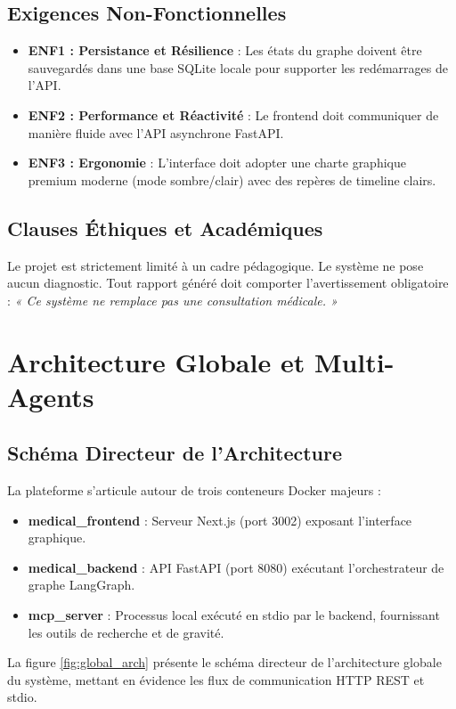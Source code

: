 \documentclass[11pt,a4paper]{report}
\begin{document}
\section{Exigences Non-Fonctionnelles}
\begin{itemize}
    \item \textbf{ENF1 : Persistance et Résilience} : Les états du graphe doivent être sauvegardés dans une base SQLite locale pour supporter les redémarrages de l'API.
    \item \textbf{ENF2 : Performance et Réactivité} : Le frontend doit communiquer de manière fluide avec l'API asynchrone FastAPI.
    \item \textbf{ENF3 : Ergonomie} : L'interface doit adopter une charte graphique premium moderne (mode sombre/clair) avec des repères de timeline clairs.
\end{itemize}

\section{Clauses Éthiques et Académiques}
Le projet est strictement limité à un cadre pédagogique. Le système ne pose aucun diagnostic. Tout rapport généré doit comporter l'avertissement obligatoire : \textit{« Ce système ne remplace pas une consultation médicale. »}

\chapter{Architecture Globale et Multi-Agents}
\section{Schéma Directeur de l'Architecture}
La plateforme s'articule autour de trois conteneurs Docker majeurs :
\begin{itemize}
    \item \textbf{medical\_frontend} : Serveur Next.js (port 3002) exposant l'interface graphique.
    \item \textbf{medical\_backend} : API FastAPI (port 8080) exécutant l'orchestrateur de graphe LangGraph.
    \item \textbf{mcp\_server} : Processus local exécuté en stdio par le backend, fournissant les outils de recherche et de gravité.
\end{itemize}

La figure \ref{fig:global_arch} présente le schéma directeur de l'architecture globale du système, mettant en évidence les flux de communication HTTP REST et stdio.
\end{document}
